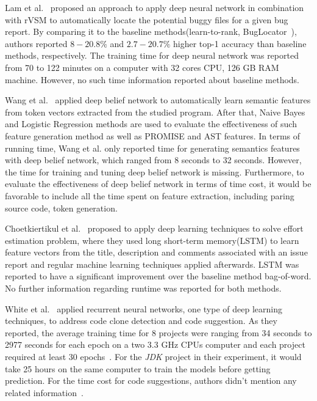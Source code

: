 Lam et al.~\cite{lam2015combining}  proposed an approach to apply deep neural network
 in combination with rVSM to automatically locate the potential buggy files for a given
 bug report. By comparing it to the baseline methods(learn-to-rank\cite{ye2014learning}, 
 BugLocator~\cite{zhou2012should}), authors reported $8-20.8\%$  and $2.7-20.7\%$ 
 higher top-1 accuracy than baseline methods, respectively. The training time for deep neural
 network was reported from 70 to 122 minutes on a computer with 32 cores CPU,
 126 GB RAM machine. However,
 no such time information reported about baseline methods.
 
 Wang et al.~\cite{wang2016automatically} applied deep belief network to automatically
 learn semantic features from token vectors extracted from the studied program. After
 that, Naive Bayes and Logistic Regression methods are used to evaluate the effectiveness
 of such feature generation method as well as PROMISE and AST features. In terms of
 running time, Wang et al. only reported time for generating semantics features with deep belief network, which
 ranged from 8 seconds to 32 seconds. However, the time for training and tuning deep belief network is
 missing. Furthermore, to evaluate the effectiveness of deep belief network in terms of time cost, 
 it would be favorable to include all the time spent on feature extraction, including
 paring source code, token generation.
 
 Choetkiertikul et al.~\cite{choetkiertikul2016deep} proposed to apply deep learning techniques
 to solve effort estimation problem, where they used long short-term memory(LSTM) to learn
 feature vectors from the title, description and comments associated with an issue report and
 regular machine learning techniques applied afterwards. LSTM was reported to have a 
 significant improvement over the baseline method bag-of-word. No further information regarding
 runtime was reported for both methods.
 
 White et al.~\cite{white2015toward, white2016deep} applied
 recurrent neural networks, one type of  deep learning techniques, 
 to address code clone detection and code suggestion. As they reported,
 the average training time for 8 projects were ranging from 34 seconds
  to 2977 seconds for each epoch on a two 3.3 GHz
 CPUs computer and each project required at least 30 epochs~\cite{white2016deep}.
 For the {\it JDK} project in their experiment, it would take 25 hours 
 on the same computer to train the models before getting prediction.
 For the time cost for code suggestions, authors didn't mention any related information~\cite{white2015toward}.


